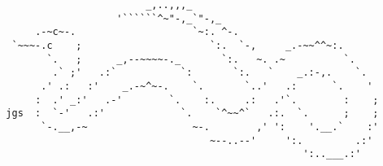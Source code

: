 \documentclass{article}
\begin{document}
\vfill
\centering
\begin{BVerbatim}
                          _,..,,,_
                     '``````^~"-,_`"-,_
       .-~c~-.                    `~:. ^-.
   `~~~-.c    ;                      `:.  `-,     _.-~~^^~:.
         `.   ;      _,--~~~~-._       `:.   ~. .~          `.
          .` ;'   .:`           `:       `:.   `    _.:-,.    `.
        .' .:   :'    _.-~^~-.    `.       `..'   .:      `.    '
       :  .' _:'   .-'        `.    :.     .:   .'`.        :    ;
  jgs  :  `-'   .:'             `.    `^~~^`   .:.  `.      ;    ;
        `-.__,-~                  ~-.        ,' ':    '.__.`    :'
                                     ~--..--'     ':.         .:'
                                                     ':..___.:'
\end{BVerbatim}
\end{document}
